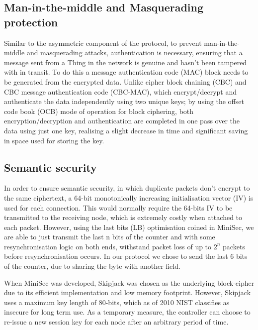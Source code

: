 \documentclass[conference]{./sty/IEEEtran}
\begin{document}
\subsection{Man-in-the-middle and Masquerading protection} %
\label{sub:man_in_the_middle_and_masquerading_protection}
Similar to the asymmetric component of the protocol, to prevent man-in-the-middle and masquerading attacks, authentication is necessary, ensuring that a message sent from a Thing in the network is genuine and hasn't been tampered with in transit. To do this a message authentication code (MAC) block needs to be generated from the encrypted data. Unlike cipher block chaining (CBC) and CBC message authentication code (CBC-MAC), which encrypt/decrypt and authenticate the data independently using two unique keys; by using the offset code book (OCB) mode of operation for block ciphering, both encryption/decryption and authentication are completed in one pass over the data using just one key, realising a slight decrease in time\cite{ContikiSec} and significant saving in space used for storing the key.

\subsection{Semantic security} %
\label{sub:semantic_security}
In order to ensure semantic security, in which duplicate packets don't encrypt to the same ciphertext, a 64-bit monotonically increasing initialisation vector (IV) is used for each connection. This would normally require the 64-bits IV to be transmitted to the receiving node, which is extremely costly when attached to each packet. However, using the last bits (LB) optimisation coined in MiniSec, we are able to just transmit the last n bits of the counter and with some resynchronisation logic on both ends, withstand packet loss of up to $2^n$ packets before resynchronisation occurs. In our protocol we chose to send the last 6 bits of the counter, due to sharing the byte with another field.

When MiniSec was developed, Skipjack was chosen as the underlying block-cipher due to its efficient implementation and low memory footprint\cite{Skipjack}. However, Skipjack uses a maximum key length of 80-bits, which as of 2010 NIST classifies as insecure for long term use\cite{NIST}. As a temporary measure, the controller can choose to re-issue a new session key for each node after an arbitrary period of time.  
\end{document}
